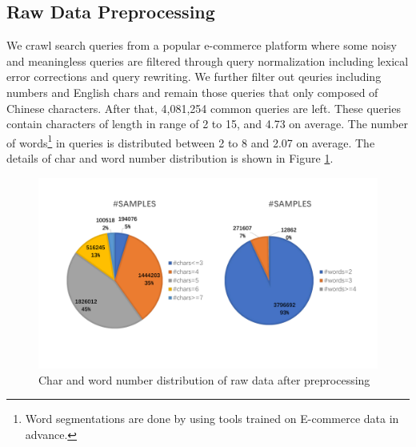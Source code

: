 \subsection{Raw Data Preprocessing}
We crawl search queries from a popular e-commerce platform 
where some noisy and meaningless queries are filtered
through query normalization including lexical error corrections and query rewriting.
We further filter out qeuries including numbers and English chars and remain  those queries that only composed of Chinese characters. 
After that, 4,081,254 common queries are left. 
These queries contain characters of length in range of 2 to 15, and 4.73 on average. The number of words\footnote{Word segmentations are done by using tools trained on E-commerce data in advance.} in queries is distributed between 2 to 8 and 2.07 on average.
The details of char and word number distribution is shown in Figure \ref{fig:wordDist}. 


\begin{figure}
	\centering
	\includegraphics[width=0.95\columnwidth]{images/distributionWords.pdf}
	\caption{Char and word number distribution of raw data after preprocessing}
	\label{fig:wordDist}
\end{figure}




